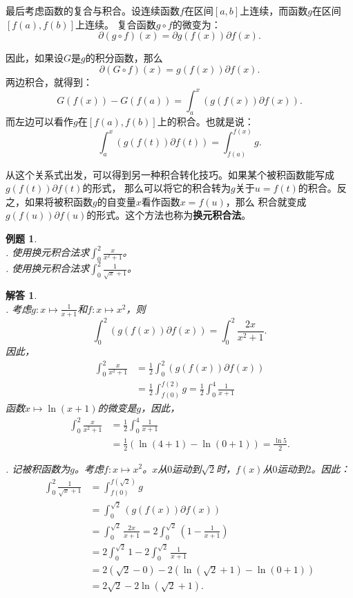 \documentclass[12pt,UTF8]{ctexbook}
\newtheorem{et}{例题}[section]
\newtheorem*{so}{解答}
\begin{document}
最后考虑函数的复合与积合。设连续函数$f$在区间$[a,b]$上连续，而函数$g$在区间$[f(a), f(b)]$上连续。
复合函数$g\circ f$的微变为：
$$ \partial (g \circ f) (x) = \partial g(f(x)) \partial f (x). $$

因此，如果设$G$是$g$的积分函数，那么
$$ \partial (G \circ f) (x) = g(f(x)) \partial f (x). $$
两边积合，就得到：
$$ G(f(x)) - G(f(a)) = \int_a^x \left( g(f(x)) \partial f (x) \right).$$
而左边可以看作$g$在$[f(a), f(b)]$上的积合。也就是说：
$$ \int_a^x \left( g(f(t)) \partial f (t) \right) = \int_{f(a)}^{f(x)} g.$$

从这个关系式出发，可以得到另一种积合转化技巧。如果某个被积函数能写成$g(f(t)) \partial f (t)$的形式，
那么可以将它的积合转为$g$关于$u = f(t)$的积合。反之，如果将被积函数$g$的自变量$x$看作函数$x = f(u)$，那么
积合就变成$g(f(u)) \partial f (u)$的形式。这个方法也称为\textbf{换元积合法}。

\begin{et}
    \mbox{} \\
    . 使用换元积合法求$\int_0^2 \frac{x}{x^2 + 1}$。 \\
    . 使用换元积合法求$\int_0^2 \frac{1}{\sqrt{x} + 1}$。
\end{et}

\begin{so}
    \mbox{} \\
    . 考虑$g: x\mapsto \frac{1}{x + 1}$和$f: x\mapsto x^2$，则
    $$ \int_0^2 \left( g(f(x)) \partial f (x) \right) = \int_0^2 \frac{2x}{x^2 + 1}. $$
    因此，
    \begin{align*}
        \int_0^2 \frac{x}{x^2 + 1} &= \frac{1}{2} \int_0^2 \left( g(f(x)) \partial f (x) \right) \\
        &= \frac{1}{2}\int_{f(0)}^{f(2)} g = \frac{1}{2}\int_0^4 \frac{1}{x + 1} 
    \end{align*}
    函数$x\mapsto \ln{(x + 1)}$的微变是$g$，因此，
    \begin{align*}
        \int_0^2 \frac{x}{x^2 + 1} &= \frac{1}{2}\int_0^4 \frac{1}{x + 1} \\
        &= \frac{1}{2}\left(\ln{(4 + 1)} - \ln{(0 + 1)}\right) = \frac{\ln{5}}{2}.
    \end{align*}

    . 记被积函数为$g$。考虑$f: x\mapsto x^2$。$x$从$0$运动到$\sqrt{2}$时，$f(x)$从$0$运动到$2$。因此：
    \begin{align*}
        \int_0^2 \frac{1}{\sqrt{x} + 1} &= \int_{f(0)}^{f(\sqrt{2})} g \\
        &= \int_0^{\sqrt{2}} \left( g(f(x)) \partial f (x) \right) \\
        &= \int_0^{\sqrt{2}} \frac{2x}{x + 1} = 2\int_0^{\sqrt{2}} \left( 1 - \frac{1}{x + 1} \right) \\
        &= 2\int_0^{\sqrt{2}} 1 - 2\int_0^{\sqrt{2}} \frac{1}{x + 1} \\
        &= 2(\sqrt{2} - 0) - 2 \left(\ln{(\sqrt{2} + 1)} - \ln{(0 + 1)}\right) \\
        &= 2\sqrt{2} - 2\ln{(\sqrt{2} + 1)}.
    \end{align*}
\end{so}
\end{document}
